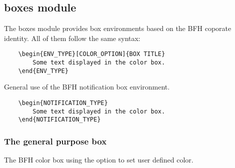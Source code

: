 \documentclass[
]{bfhpub}				%
\begin{document}
%

\subsection{boxes module}

The boxes module provides box environments based on the BFH coporate identity.
All of them follow the same syntax:

\begin{verbatim}
	\begin{ENV_TYPE}[COLOR_OPTION]{BOX TITLE}
		Some text displayed in the color box.
	\end{ENV_TYPE}
\end{verbatim}

General use of the BFH notification box environment.
\begin{verbatim}
	\begin{NOTIFICATION_TYPE}
		Some text displayed in the color box.
	\end{NOTIFICATION_TYPE}
\end{verbatim}


\subsubsection{The general purpose box}
The BFH color box using the option to set user defined color.
\end{document}
